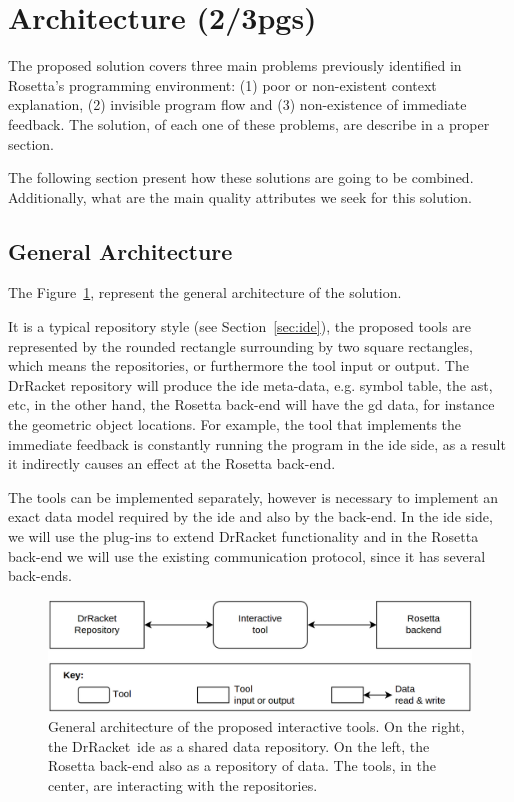 
% 
% 

\section{Architecture (2/3pgs)}
\label{sec:arch}

The proposed solution covers three main problems previously identified in Rosetta's programming environment: (1) poor or non-existent context explanation, (2) invisible program flow and (3) non-existence of immediate feedback. The solution, of each one of these problems, are describe in a proper section. 

The following section present how these solutions are going to be combined. Additionally, what are the main quality attributes we seek for this solution.

\subsection{General Architecture}

The Figure~\ref{fig:sol}, represent the general architecture of the solution.

It is a typical repository style (see Section~\ref{sec:ide}), the proposed tools are represented by the rounded rectangle surrounding by two square rectangles, which means the repositories, or furthermore the tool input or output. The DrRacket repository will produce the \ac{ide} meta-data, e.g. symbol table, the \ac{ast}, etc, in the other hand, the Rosetta back-end will have the \ac{gd} data, for instance the geometric object locations. For example, the tool that implements the immediate feedback is constantly running the program in the \ac{ide} side, as a result it indirectly causes an effect at the Rosetta back-end.

The tools can be implemented separately, however is necessary to implement an exact data model required by the \ac{ide} and also by the back-end. In the \ac{ide} side, we will use the plug-ins to extend DrRacket functionality and in the Rosetta back-end we will use the existing communication protocol, since it has several back-ends. 


\begin{figure}[!htbp]
 \centering
 \includegraphics[scale=0.2]{img/sol}
 \caption{General architecture of the proposed interactive tools. On the right, the DrRacket~\ac{ide} as a shared data repository. On the left, the Rosetta back-end also as a repository of data. The tools, in the center, are interacting with the repositories.}
 \label{fig:sol}
\end{figure}

